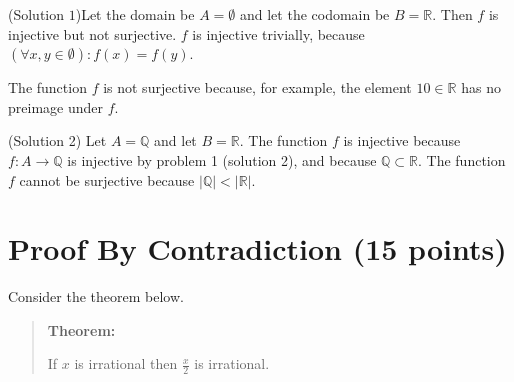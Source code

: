 \documentclass[11pt]{article}
\def\R{\mathbb{R}}
\def\Q{\mathbb{Q}}
\def\Z{\mathbb{Z}}
\def\sectionOneA#1{}
\def\sectionOneB#1{}
\def\sectionTwoA#1{}
\def\sectionTwoB#1{}
\def\sectionVicsection#1{#1}
\newcounter{pgpts}
\newcounter{cumpts}
\newcommand{\cnewpage}{\addtocounter{cumpts}{\value{pgpts}}\newpage\setcounter{pgpts}{0}}
\begin{document}
\begin{enumerate}
    \vspace*{1cm}
    (Solution $1$)Let the domain be $A=\emptyset$ and let the codomain be $B=\mathbb{R}$. Then $f$ is injective but not surjective. $f$ is injective trivially, because $(\forall x,y \in \emptyset) : f(x)=f(y)$.

    The function $f$ is not surjective because, for example, the element $10\in \mathbb{R}$ has no preimage under $f$.

    \vspace*{1cm}
    (Solution 2) Let $A=\mathbb{Q}$ and let $B=\mathbb{R}$. The function $f$ is injective because $f:A\to \mathbb{Q}$ is injective by problem 1 (solution 2), and because $\mathbb{Q}\subset \mathbb{R}$. The function $f$ cannot be surjective because $|\mathbb{Q}|<|\mathbb{R}|$.
  \end{enumerate}








\cnewpage

\section{Proof By \sectionOneA{Contrapositive}\sectionOneB{Contrapositive}\sectionTwoA{Contradiction}\sectionTwoB{Contradiction}\sectionVicsection{Contradiction} (15 points)}\addtocounter{pgpts}{15}

Consider the theorem below.
\begin{quote}
  {\bf Theorem:}
  \sectionOneA{If $x^3$ is irrational then $x$ is irrational.}
  \sectionOneB{If $x^4$ is irrational then $x$ is irrational.} %
  \sectionTwoA{If $x^3$ is irrational then $x$ is irrational.}
  \sectionTwoB{If $x^4$ is irrational then $x$ is irrational.} %
  \sectionVicsection{If $x$ is irrational then $\frac{x}{2}$ is irrational.}
  
%
\end{quote}
\end{document}
